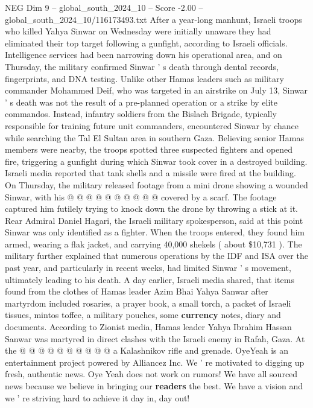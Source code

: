 \begin{textsample}{NEG Dim 9 – global\_south\_2024\_10 – Score -2.00 – global\_south\_2024\_10/116173493.txt}  \label{ex:f9_neg_372}
After a year-long manhunt, Israeli troops who killed Yahya Sinwar on Wednesday were initially unaware they had eliminated their top target following a gunfight, according to Israeli officials.
Intelligence services had been narrowing down his operational area, and on Thursday, the military confirmed Sinwar ' s death through dental records, fingerprints, and DNA testing.
Unlike other Hamas leaders such as military commander Mohammed Deif, who was targeted in an airstrike on July 13, Sinwar ' s death was not the result of a pre-planned operation or a strike by elite commandos.
Instead, infantry soldiers from the Bislach Brigade, typically responsible for training future unit commanders, encountered Sinwar by chance while searching the Tal El Sultan area in southern Gaza.
Believing senior Hamas members were nearby, the troops spotted three suspected fighters and opened fire, triggering a gunfight during which Sinwar took cover in a destroyed building.
Israeli media reported that tank shells and a missile were fired at the building.
On Thursday, the military released footage from a mini drone showing a wounded Sinwar, with his @ @ @ @ @ @ @ @ @ @ covered by a scarf.
The footage captured him futilely trying to knock down the drone by throwing a stick at it.
Rear Admiral Daniel Hagari, the Israeli military spokesperson, said at this point Sinwar was only identified as a fighter.
When the troops entered, they found him armed, wearing a flak jacket, and carrying 40,000 shekels ( about \$10,731 ).
The military further explained that numerous operations by the IDF and ISA over the past year, and particularly in recent weeks, had limited Sinwar ' s movement, ultimately leading to his death.
A day earlier, Israeli media shared, that items found from the clothes of Hamas leader Azim Bhai Yahya Sanwar after martyrdom included rosaries, a prayer book, a small torch, a packet of Israeli tissues, mintos toffee, a military pouches, some \textbf{currency} notes, diary and documents.
According to Zionist media, Hamas leader Yahya Ibrahim Hassan Sanwar was martyred in direct clashes with the Israeli enemy in Rafah, Gaza.
At the @ @ @ @ @ @ @ @ @ @ a Kalashnikov rifle and grenade.
OyeYeah is an entertainment project powered by Alliancez Inc.
We ' re motivated to digging up fresh, authentic news.
Oye Yeah does not work on rumors!
We have all sourced news because we believe in bringing our \textbf{readers} the best.
We have a vision and we ' re striving hard to achieve it day in, day out!

\end{textsample}
